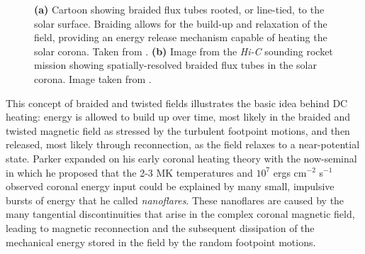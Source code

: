 \begin{figure}[htbp]
	\centering
	\caption{\textbf{(a)} Cartoon showing braided flux tubes rooted, or line-tied, to the solar surface. Braiding allows for the build-up and relaxation of the field, providing an energy release mechanism capable of heating the solar corona. Taken from \citet{parker_magnetic_1983-1}. \textbf{(b)} Image from the \textit{Hi-C} sounding rocket mission showing spatially-resolved braided flux tubes in the solar corona. Image taken from \citet{cirtain_energy_2013}.}
	\label{fig:coronal_braids}
\end{figure}
%
\par This concept of braided and twisted fields illustrates the basic idea behind DC heating: energy is allowed to build up over time, most likely in the braided and twisted magnetic field as stressed by the turbulent footpoint motions, and then released, most likely through reconnection, as the field relaxes to a near-potential state. Parker expanded on his early coronal heating theory with the now-seminal \citep{parker_nanoflares_1988} in which he proposed that the 2-3 MK temperatures and $10^7$ ergs cm$^{-2}$ s$^{-1}$ observed coronal energy input \citep{withbroe_mass_1977} could be explained by many small, impulsive bursts of energy that he called \textit{nanoflares}. These nanoflares are caused by the many tangential discontinuities that arise in the complex coronal magnetic field, leading to magnetic reconnection and the subsequent dissipation of the mechanical energy stored in the field by the random footpoint motions. 

